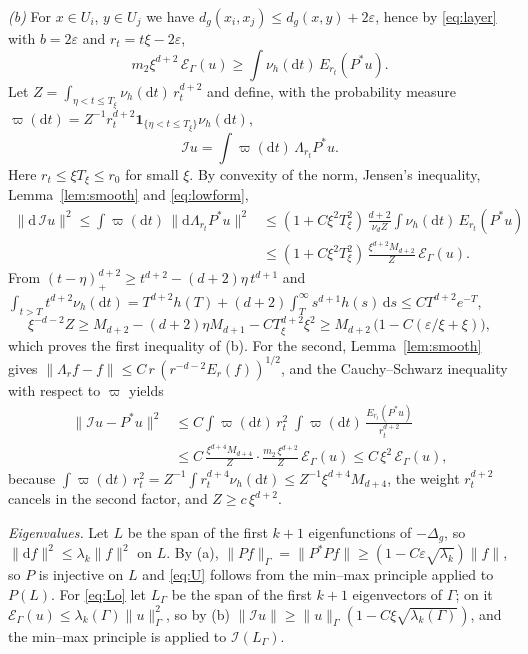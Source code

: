 \documentclass[11pt,a4paper]{article}
\makeatletter
\theoremstyle{stmt}
\theoremstyle{defn}
\theoremstyle{rmk}
\renewenvironment{proof}[1][\proofname]{\par\pushQED{\qed}\normalfont\topsep6\p@\@plus6\p@\relax
  \trivlist\item[\hskip\labelsep{\sffamily\itshape\small #1.}]\ignorespaces}{\popQED\endtrivlist\@endpefalse}
\numberwithin{equation}{section}
\newcommand{\dd}{\mathrm{d}}
\makeatother
\begin{document}
\begin{proof}
\emph{(b)} For $x\in U_i$, $y\in U_j$ we have $d_g(x_i,x_j)\le d_g(x,y)+2\varepsilon$, hence by \eqref{eq:layer} with $b=2\varepsilon$ and $r_t=t\xi-2\varepsilon$,
\begin{equation}\label{eq:lowform}
m_2\xi^{d+2}\,\mathcal E_\Gamma(u)\ge\int\nu_h(\dd t)\,E_{r_t}(P^*u).
\end{equation}
Let $Z=\int_{\eta<t\le T_\xi}\nu_h(\dd t)\,r_t^{d+2}$ and define, with the probability measure $\varpi(\dd t)=Z^{-1}r_t^{d+2}\mathbf 1_{\{\eta<t\le T_\xi\}}\nu_h(\dd t)$,
\[
\mathcal Iu=\int\varpi(\dd t)\,\Lambda_{r_t}P^*u .
\]
Here $r_t\le\xi T_\xi\le r_0$ for small $\xi$. By convexity of the norm, Jensen's inequality, Lemma~\ref{lem:smooth} and \eqref{eq:lowform},
\[
\begin{split}
\|\dd\,\mathcal Iu\|^2\le\int\varpi(\dd t)\,\|\dd\Lambda_{r_t}P^*u\|^2&\le(1+C\xi^2T_\xi^2)\,\frac{d+2}{\nu_dZ}\int\nu_h(\dd t)\,E_{r_t}(P^*u)\\
&\le(1+C\xi^2T_\xi^2)\,\frac{\xi^{d+2}M_{d+2}}{Z}\,\mathcal E_\Gamma(u).
\end{split}
\]
From $(t-\eta)_+^{d+2}\ge t^{d+2}-(d+2)\eta\,t^{d+1}$ and $\int_{t>T}t^{d+2}\nu_h(\dd t)=T^{d+2}h(T)+(d+2)\int_T^\infty s^{d+1}h(s)\,\dd s\le CT^{d+2}e^{-T}$,
\[
\xi^{-d-2}Z\ge M_{d+2}-(d+2)\eta M_{d+1}-CT_\xi^{d+2}\xi^2\ge M_{d+2}\,\big(1-C(\varepsilon/\xi+\xi)\big),
\]
which proves the first inequality of (b). For the second, Lemma~\ref{lem:smooth} gives $\|\Lambda_rf-f\|\le C\,r\,(r^{-d-2}E_r(f))^{1/2}$, and the Cauchy--Schwarz inequality with respect to $\varpi$ yields
\[
\begin{split}
\|\mathcal Iu-P^*u\|^2&\le C\int\varpi(\dd t)\,r_t^2\;\int\varpi(\dd t)\,\frac{E_{r_t}(P^*u)}{r_t^{d+2}}\\
&\le C\,\frac{\xi^{d+4}M_{d+4}}{Z}\cdot\frac{m_2\,\xi^{d+2}}{Z}\,\mathcal E_\Gamma(u)\le C\,\xi^2\,\mathcal E_\Gamma(u),
\end{split}
\]
because $\int\varpi(\dd t)\,r_t^2=Z^{-1}\int r_t^{d+4}\nu_h(\dd t)\le Z^{-1}\xi^{d+4}M_{d+4}$, the weight $r_t^{d+2}$ cancels in the second factor, and $Z\ge c\,\xi^{d+2}$.

\emph{Eigenvalues.} Let $L$ be the span of the first $k+1$ eigenfunctions of $-\Delta_g$, so $\|\dd f\|^2\le\lambda_k\|f\|^2$ on $L$. By (a), $\|Pf\|_\Gamma=\|P^*Pf\|\ge(1-C\varepsilon\sqrt{\lambda_k})\|f\|$, so $P$ is injective on $L$ and \eqref{eq:U} follows from the min--max principle applied to $P(L)$. For \eqref{eq:Lo} let $L_\Gamma$ be the span of the first $k+1$ eigenvectors of $\Gamma$; on it $\mathcal E_\Gamma(u)\le\lambda_k(\Gamma)\|u\|_\Gamma^2$, so by (b) $\|\mathcal Iu\|\ge\|u\|_\Gamma(1-C\xi\sqrt{\lambda_k(\Gamma)})$, and the min--max principle is applied to $\mathcal I(L_\Gamma)$.
\end{proof}
\end{document}
